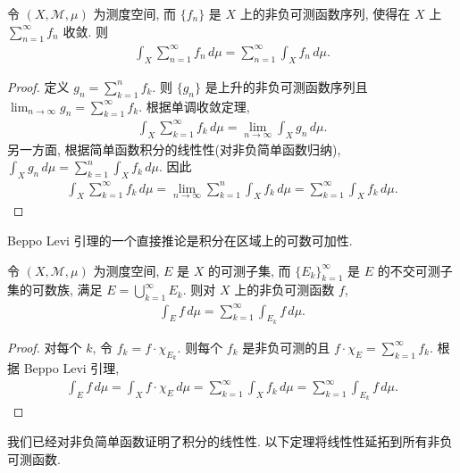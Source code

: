 \documentclass[../../main.tex]{subfiles}
\begin{document}
\begin{corollary}\label{corollary:ch18-beppo-levi}
令 $(X,\mathcal{M},\mu)$ 为测度空间, 而 $\{f_{n}\}$ 是 $X$ 上的非负可测函数序列, 使得在 $X$ 上 $\sum_{n=1}^{\infty}f_{n}$ 收敛. 则
\begin{align}
\int_{X}\sum_{n=1}^{\infty}f_{n}\,d\mu=\sum_{n=1}^{\infty}\int_{X}f_{n}\,d\mu.\label{align:ch18-beppo-levi}
\end{align}
\end{corollary}

\begin{proof}
定义 $g_{n}=\sum_{k=1}^{n}f_{k}$. 则 $\{g_{n}\}$ 是上升的非负可测函数序列且 $\lim_{n\to\infty}g_{n}=\sum_{k=1}^{\infty}f_{k}$. 根据单调收敛定理,
\begin{align*}
\int_{X}\sum_{k=1}^{\infty}f_{k}\,d\mu=\lim_{n\to\infty}\int_{X}g_{n}\,d\mu.
\end{align*}
另一方面, 根据简单函数积分的线性性(对非负简单函数归纳), $\int_{X}g_{n}\,d\mu=\sum_{k=1}^{n}\int_{X}f_{k}\,d\mu$. 因此
\begin{align*}
\int_{X}\sum_{k=1}^{\infty}f_{k}\,d\mu=\lim_{n\to\infty}\sum_{k=1}^{n}\int_{X}f_{k}\,d\mu=\sum_{k=1}^{\infty}\int_{X}f_{k}\,d\mu.
\end{align*}
\end{proof}

Beppo Levi 引理的一个直接推论是积分在区域上的可数可加性.

\begin{corollary}\label{corollary:ch18-countable-additivity-integral}
令 $(X,\mathcal{M},\mu)$ 为测度空间, $E$ 是 $X$ 的可测子集, 而 $\{E_{k}\}_{k=1}^{\infty}$ 是 $E$ 的不交可测子集的可数族, 满足 $E=\bigcup_{k=1}^{\infty}E_{k}$. 则对 $X$ 上的非负可测函数 $f$,
\begin{align*}
\int_{E}f\,d\mu=\sum_{k=1}^{\infty}\int_{E_{k}}f\,d\mu.
\end{align*}
\end{corollary}

\begin{proof}
对每个 $k$, 令 $f_{k}=f\cdot\chi_{E_{k}}$. 则每个 $f_{k}$ 是非负可测的且 $f\cdot\chi_{E}=\sum_{k=1}^{\infty}f_{k}$. 根据 Beppo Levi 引理,
\begin{align*}
\int_{E}f\,d\mu=\int_{X}f\cdot\chi_{E}\,d\mu=\sum_{k=1}^{\infty}\int_{X}f_{k}\,d\mu=\sum_{k=1}^{\infty}\int_{E_{k}}f\,d\mu.
\end{align*}
\end{proof}

我们已经对非负简单函数证明了积分的线性性. 以下定理将线性性延拓到所有非负可测函数.
\end{document}

